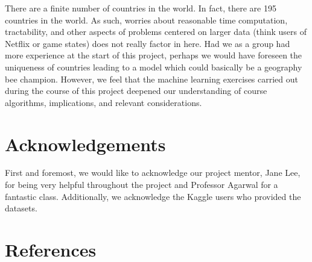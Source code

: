 \documentclass{article}
\begin{document}
\begin{multicols}{2}
There are a finite number of countries in the world. In fact, there are 195 countries in the world. As such, worries about reasonable time computation, tractability, and other aspects of problems centered on larger data (think users of Netflix or game states) does not really factor in here. Had we as a group had more experience at the start of this project, perhaps we would have foreseen the uniqueness of countries leading to a model which could basically be a geography bee champion. However, we feel that the machine learning exercises carried out during the course of this project deepened our understanding of course algorithms, implications, and relevant considerations.








\section{Acknowledgements} First and foremost, we would like to acknowledge our project mentor, Jane Lee, for being very helpful throughout the project and Professor Agarwal for a fantastic class. Additionally, we acknowledge the Kaggle users who provided the datasets.

\end{multicols}

\pagebreak

\section{References} \theendnotes
\end{document}
